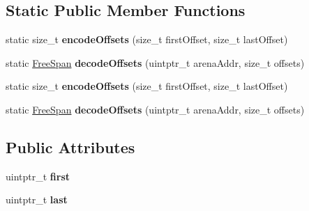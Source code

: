 \subsection*{Static Public Member Functions}
\begin{DoxyCompactItemize}
\item 
\hypertarget{structjs_1_1gc_1_1_free_span_a1dfefd34d5dc2d13a442c0f802be9188}{static size\-\_\-t {\bfseries encode\-Offsets} (size\-\_\-t first\-Offset, size\-\_\-t last\-Offset)}\label{structjs_1_1gc_1_1_free_span_a1dfefd34d5dc2d13a442c0f802be9188}

\item 
\hypertarget{structjs_1_1gc_1_1_free_span_a558be40f316be9a7d63e00f05d3071a7}{static \hyperlink{structjs_1_1gc_1_1_free_span}{Free\-Span} {\bfseries decode\-Offsets} (uintptr\-\_\-t arena\-Addr, size\-\_\-t offsets)}\label{structjs_1_1gc_1_1_free_span_a558be40f316be9a7d63e00f05d3071a7}

\item 
\hypertarget{structjs_1_1gc_1_1_free_span_a1dfefd34d5dc2d13a442c0f802be9188}{static size\-\_\-t {\bfseries encode\-Offsets} (size\-\_\-t first\-Offset, size\-\_\-t last\-Offset)}\label{structjs_1_1gc_1_1_free_span_a1dfefd34d5dc2d13a442c0f802be9188}

\item 
\hypertarget{structjs_1_1gc_1_1_free_span_a558be40f316be9a7d63e00f05d3071a7}{static \hyperlink{structjs_1_1gc_1_1_free_span}{Free\-Span} {\bfseries decode\-Offsets} (uintptr\-\_\-t arena\-Addr, size\-\_\-t offsets)}\label{structjs_1_1gc_1_1_free_span_a558be40f316be9a7d63e00f05d3071a7}

\end{DoxyCompactItemize}
\subsection*{Public Attributes}
\begin{DoxyCompactItemize}
\item 
\hypertarget{structjs_1_1gc_1_1_free_span_a0301aab597c0c71166047755f1e76401}{uintptr\-\_\-t {\bfseries first}}\label{structjs_1_1gc_1_1_free_span_a0301aab597c0c71166047755f1e76401}

\item 
\hypertarget{structjs_1_1gc_1_1_free_span_acba42065c5e1ef980c28f570a2d89844}{uintptr\-\_\-t {\bfseries last}}\label{structjs_1_1gc_1_1_free_span_acba42065c5e1ef980c28f570a2d89844}

\end{DoxyCompactItemize}
